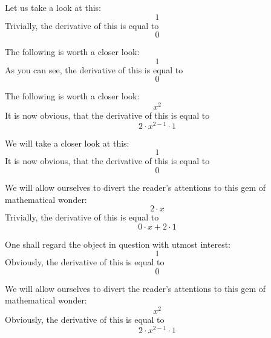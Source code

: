 \documentclass{article}
\begin{document}
Let us take a look at this:
\begin{equation}
1 
\end{equation}
Trivially, the derivative of this is equal to
\begin{equation}
0 
\end{equation}

The following is worth a closer look:
\begin{equation}
1 
\end{equation}
As you can see, the derivative of this is equal to
\begin{equation}
0 
\end{equation}

The following is worth a closer look:
\begin{equation}
x ^{2 } 
\end{equation}
It is now obvious, that the derivative of this is equal to
\begin{equation}
2 \cdot x ^{2 - 1 } \cdot 1 
\end{equation}

We will take a closer look at this:
\begin{equation}
1 
\end{equation}
It is now obvious, that the derivative of this is equal to
\begin{equation}
0 
\end{equation}

We will allow ourselves to divert the reader's attentions to this gem of mathematical wonder:
\begin{equation}
2 \cdot x 
\end{equation}
Trivially, the derivative of this is equal to
\begin{equation}
0 \cdot x + 2 \cdot 1 
\end{equation}

One shall regard the object in question with utmost interest:
\begin{equation}
1 
\end{equation}
Obviously, the derivative of this is equal to
\begin{equation}
0 
\end{equation}

We will allow ourselves to divert the reader's attentions to this gem of mathematical wonder:
\begin{equation}
x ^{2 } 
\end{equation}
Obviously, the derivative of this is equal to
\begin{equation}
2 \cdot x ^{2 - 1 } \cdot 1 
\end{equation}
\end{document}
